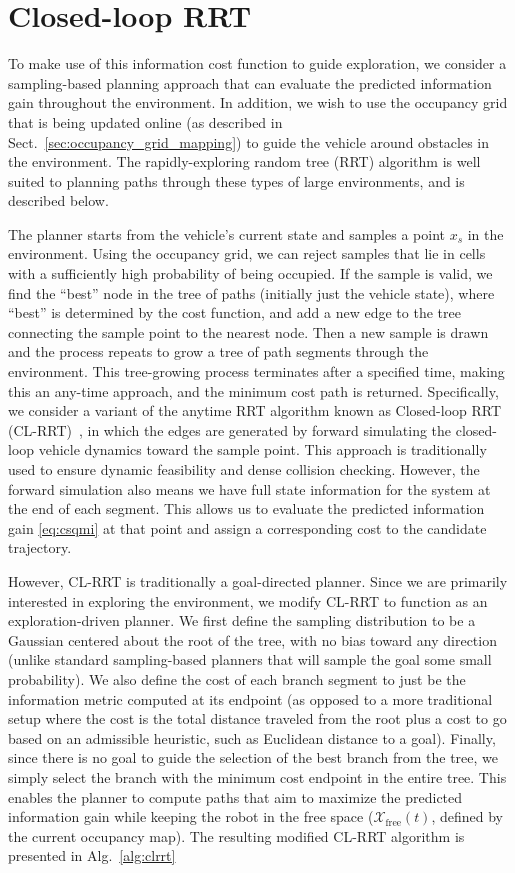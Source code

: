 \section{Closed-loop RRT}
\label{sec:planner}

To make use of this information cost function to guide exploration, we consider a sampling-based planning approach that can evaluate the predicted information gain throughout the environment. In addition, we wish to use the occupancy grid that is being updated online (as described in Sect.~\ref{sec:occupancy_grid_mapping}) to guide the vehicle around obstacles in the environment. The rapidly-exploring random tree (RRT) algorithm is well suited to planning paths through these types of large environments, and is described below. 

The planner starts from the vehicle's current state and samples a point $x_s$ in the environment. Using the occupancy grid, we can reject samples that lie in cells with a sufficiently high probability of being occupied. If the sample is valid, we find the ``best'' node in the tree of paths (initially just the vehicle state), where ``best'' is determined by the cost function, and add a new edge to the tree connecting the sample point to the nearest node.
Then a new sample is drawn and the process repeats to grow a tree of path segments through the environment. This tree-growing process terminates after a specified time, making this an any-time approach, and the minimum cost path is returned. Specifically, we consider a variant of the anytime RRT algorithm known as Closed-loop RRT (CL-RRT)~\cite{Kuwata09_TCST}, in which the edges are generated by forward simulating the closed-loop vehicle dynamics toward the sample point. This approach is traditionally used to ensure dynamic feasibility and dense collision checking. However, the forward simulation also means we have full state information for the system at the end of each segment. This allows us to evaluate the predicted information gain \eqref{eq:csqmi} at that point and assign a corresponding cost to the candidate trajectory.

However, CL-RRT is traditionally a goal-directed planner. Since we are primarily interested in exploring the environment, we modify CL-RRT to function as an exploration-driven planner. We first define the sampling distribution to be a Gaussian centered about the root of the tree, with no bias toward any direction (unlike standard sampling-based planners that will sample the goal some small probability). We also define the cost of each branch segment to just be the information metric computed at its endpoint (as opposed to a more traditional setup where the cost is the total distance traveled from the root plus a cost to go based on an admissible heuristic, such as Euclidean distance to a goal). Finally, since there is no goal to guide the selection of the best branch from the tree, we simply select the branch with the minimum cost endpoint in the entire tree. This enables the planner to compute paths that aim to maximize the predicted information gain while keeping the robot in the free space ($\mathcal{X}_\text{free}(t)$, defined by the current occupancy map). The resulting modified CL-RRT algorithm is presented in Alg.~\ref{alg:clrrt}

